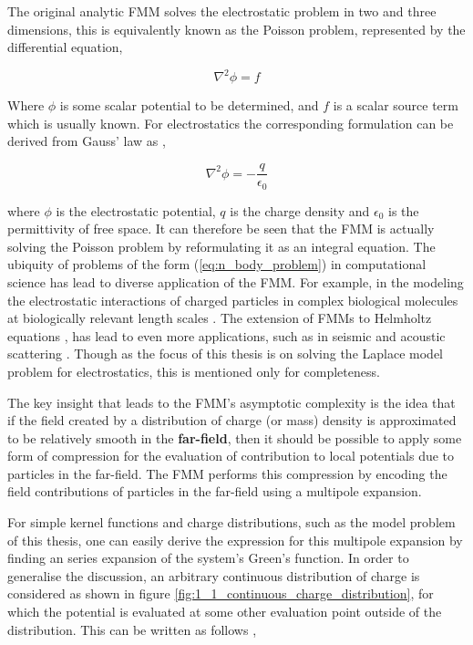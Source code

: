 The original analytic FMM solves the electrostatic problem
in two and three dimensions, this is equivalently known as the Poisson problem,
represented by the differential equation,

\begin{equation}
    \nabla^2 \phi =f
\label{eq:poisson}
\end{equation}

Where $\phi$ is some scalar potential to be determined, and $f$ is a scalar source
term which is usually known. For electrostatics the corresponding formulation
can be derived from Gauss' law as \cite{Griffiths:2017:CUP},

\begin{equation}
  \nabla^2 \phi = - \frac{q}{\epsilon_0}
\label{eq:electrostatic_poisson}
\end{equation}

where $\phi$ is the electrostatic potential, $q$ is the charge density and
$\epsilon_0$ is the permittivity of free space. It can therefore be seen that
the \gls{FMM} is actually solving the Poisson problem by reformulating it as an
integral equation. The ubiquity of problems of the form (\ref{eq:n_body_problem})
in computational science has lead to diverse application of the FMM. For example,
in the modeling the electrostatic interactions of charged particles in complex
biological molecules at biologically relevant length scales \cite{Board:1992:CPL}.
The extension of FMMs to Helmholtz equations \cite{Rokhlin:1990:JCP}, has lead
to even more applications, such as in seismic and acoustic scattering
\cite{Hwu:2011:MKP}. Though as the focus of this thesis is on solving the Laplace
model problem for electrostatics, this is mentioned only for completeness.

The key insight that leads to the \gls{FMM}'s asymptotic complexity is the idea
that if the field created by a distribution of charge (or mass) density is approximated
to be relatively smooth in the \textbf{\gls{far-field}}, then it should be possible to apply
some form of compression for the evaluation of contribution to local potentials due
to particles in the \gls{far-field}. The FMM performs this compression by encoding
the field contributions of particles in the \gls{far-field} using a multipole
expansion.

For simple kernel functions and charge distributions, such as the model problem
of this thesis, one can easily derive the expression for this multipole expansion
by finding an series expansion of the system's Green's function.
In order to generalise the discussion, an arbitrary continuous
distribution of charge is considered as shown in figure \ref{fig:1_1_continuous_charge_distribution},
for which the potential is evaluated at some other evaluation point outside of
the distribution. This can be written as follows \cite{Griffiths:2017:CUP},

